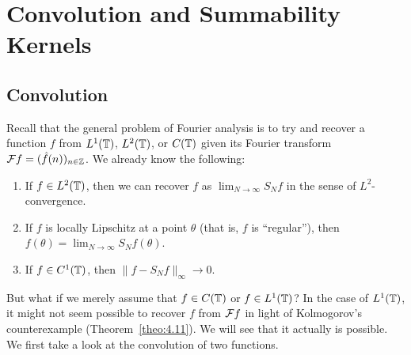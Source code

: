 \section{Convolution and Summability Kernels} \label{sec:5}

\subsection{Convolution} \label{subsec:5.1}
Recall that the general problem of Fourier analysis is to try 
and recover a function $f$ from $L^1(\mathbb{T})$, $L^2(\mathbb{T})$, or $C(\mathbb{T})$ 
given its Fourier transform ${\cal F}f = (\hat f(n))_{n\in\mathbb{Z}}$. 
We already know the following: 
\begin{enumerate}[(1)]
    \item If $f \in L^2(\mathbb{T})$, then we can recover $f$ as 
    $\lim_{N\to\infty} S_N f$ in the sense of $L^2$-convergence. 
    \item If $f$ is locally Lipschitz at a point $\theta$ (that is, 
    $f$ is ``regular''), then $f(\theta) = \lim_{N\to\infty} S_N f(\theta)$. 
    \item If $f \in C^1(\mathbb{T})$, then $\|f - S_N f\|_\infty \to 0$. 
\end{enumerate}
But what if we merely assume that $f \in C(\mathbb{T})$ or $f \in L^1(\mathbb{T})$? 
In the case of $L^1(\mathbb{T})$, it might not seem possible to recover 
$f$ from ${\cal F}f$ in light of Kolmogorov's counterexample 
(Theorem~\ref{theo:4.11}). We will see that it actually is possible.
We first take a look at the convolution of two functions. 

